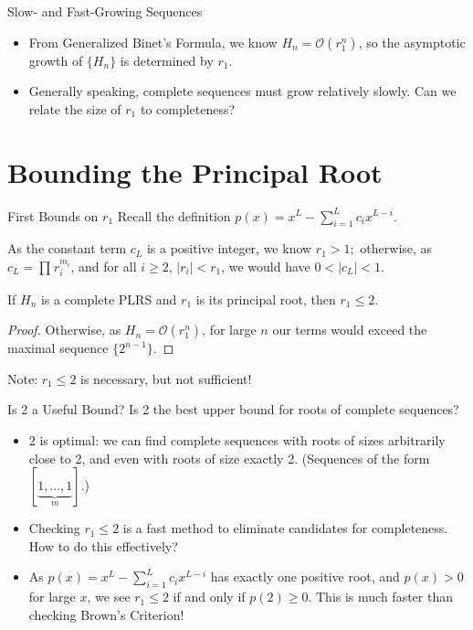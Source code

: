 \documentclass{beamer}
\begin{document}
\begin{frame}{Slow- and Fast-Growing Sequences}
\begin{itemize}
\item
	From Generalized Binet's Formula, we know $H_{n}=\mathcal{O}\left( r_1^{n} \right) $, so the asymptotic growth of $\{ H_{n} \}$ is determined by $r_1$.
	\pause
	\bigskip
	\bigskip
\item
Generally speaking, complete sequences must grow relatively slowly. Can we relate the size of $r_1$ to completeness?
\end{itemize}	
\end{frame}
\section{Bounding the Principal Root}
\begin{frame}{First Bounds on $r_1$}
Recall the definition $p(x)=x^{L}-\sum_{i=1}^{L}c_{i}x^{L-i}$.

	\pause
As the constant term  $c_{L}$ is a positive integer, we know $r_1>1;$ otherwise, as $c_{L}=\prod_{}^{}r_{i}^{m_{i}}$, and for all $i\geq 2$, $\left| r_{i} \right|<r_1$, we would have $0<|c_{L}|<1$. 
	
\pause
\begin{lemma}[SMALL 2020]
If $H_n$ is a complete PLRS and $r_1$ is its principal root, then $r_1\leq 2$.
\end{lemma}
\pause
\begin{proof}
	Otherwise, as $H_{n}=\mathcal{O}\left( r_1^{n} \right) $, for large $n$ our terms would exceed the maximal sequence $\{ 2^{n-1} \}$.
\end{proof}
	\pause
 Note: $r_1\leq 2$ is necessary, but not sufficient!


\end{frame}
\begin{frame}{Is 2 a Useful Bound?}
		Is 2 the best upper bound for roots of complete sequences?
			\pause
	\begin{itemize}
	\item
		2 is optimal: we can find complete sequences with roots of sizes arbitrarily close to 2, and even with roots of size exactly 2. (Sequences of the form $[\underbrace{1,\ldots,1}_{m}]$.)
	\pause
\item
Checking $r_1\leq 2$ is a fast method to eliminate candidates for completeness. \pause How to do this effectively?
\pause
\item
	As $p(x)=x^{L}-\sum_{i=1}^{L}c_{i}x^{L-i}$ has exactly one positive root, and $p(x)>0$ for large $x$, we see $r_1\leq 2$ if and only if $p(2)\geq 0$. This is much faster than checking Brown's Criterion!
	\end{itemize}
\end{frame}
\end{document}
